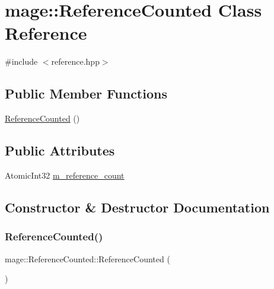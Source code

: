 \hypertarget{classmage_1_1_reference_counted}{}\section{mage\+:\+:Reference\+Counted Class Reference}
\label{classmage_1_1_reference_counted}


{\ttfamily \#include $<$reference.\+hpp$>$}

\subsection*{Public Member Functions}
\begin{DoxyCompactItemize}
\item 
\hyperlink{classmage_1_1_reference_counted_a3775f5ae578b97eb8cd6c963c077faea}{Reference\+Counted} ()
\end{DoxyCompactItemize}
\subsection*{Public Attributes}
\begin{DoxyCompactItemize}
\item 
Atomic\+Int32 \hyperlink{classmage_1_1_reference_counted_a8ff45f2437be26148d0efcd271adaf45}{m\+\_\+reference\+\_\+count}
\end{DoxyCompactItemize}


\subsection{Constructor \& Destructor Documentation}
\hypertarget{classmage_1_1_reference_counted_a3775f5ae578b97eb8cd6c963c077faea}{}\label{classmage_1_1_reference_counted_a3775f5ae578b97eb8cd6c963c077faea} 
\subsubsection{\texorpdfstring{Reference\+Counted()}{ReferenceCounted()}}
{\footnotesize\ttfamily mage\+::\+Reference\+Counted\+::\+Reference\+Counted (\begin{DoxyParamCaption}{ }\end{DoxyParamCaption})}



